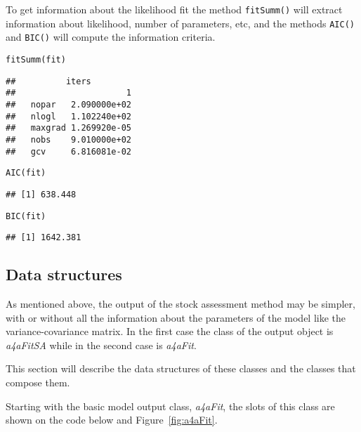 \documentclass[a4paper,english,10pt]{article}\usepackage[]{graphicx}\usepackage[]{color}
\makeatletter
\newcommand{\hlstd}[1]{\textcolor[rgb]{0,0,0}{#1}}%
\newcommand{\hlkwd}[1]{\textcolor[rgb]{0.361,0.506,0.596}{#1}}%
\newenvironment{kframe}{%
 \def\at@end@of@kframe{}%
 \ifinner\ifhmode%
  \def\at@end@of@kframe{\end{minipage}}%
  \begin{minipage}{\columnwidth}%
 \fi\fi%
 \def\FrameCommand##1{\hskip\@totalleftmargin \hskip-\fboxsep
 \colorbox{shadecolor}{##1}\hskip-\fboxsep
     \hskip-\linewidth \hskip-\@totalleftmargin \hskip\columnwidth}%
 \MakeFramed {\advance\hsize-\width
   \@totalleftmargin\z@ \linewidth\hsize
   \@setminipage}}%
 {\par\unskip\endMakeFramed%
 \at@end@of@kframe}
\newenvironment{knitrout}{}{} %
\newcommand{\code}[1]{{\texttt{#1}}}
\newcommand{\class}[1]{{\textit{#1}}}
\makeatother
\begin{document}


To get information about the likelihood fit the method \code{fitSumm()} will extract information about likelihood, number of parameters, etc, and the methods \code{AIC()} and \code{BIC()} will compute the information criteria.

\begin{knitrout}
\color{fgcolor}\begin{kframe}
\begin{alltt}
\hlkwd{fitSumm}\hlstd{(fit)}
\end{alltt}
\begin{verbatim}
##          iters
##                      1
##   nopar   2.090000e+02
##   nlogl   1.102240e+02
##   maxgrad 1.269920e-05
##   nobs    9.010000e+02
##   gcv     6.816081e-02
\end{verbatim}
\begin{alltt}
\hlkwd{AIC}\hlstd{(fit)}
\end{alltt}
\begin{verbatim}
## [1] 638.448
\end{verbatim}
\begin{alltt}
\hlkwd{BIC}\hlstd{(fit)}
\end{alltt}
\begin{verbatim}
## [1] 1642.381
\end{verbatim}
\end{kframe}
\end{knitrout}

\subsection{Data structures}

As mentioned above, the output of the stock assessment method may be simpler, with or without all the information about the parameters of the model like the variance-covariance matrix. In the first case the class of the output object is \class{a4aFitSA} while in the second case is \class{a4aFit}.

This section will describe the data structures of these classes and the classes that compose them.

Starting with the basic model output class, \class{a4aFit}, the slots of this class are shown on the code below and Figure~\ref{fig:a4aFit}.
\end{document}
